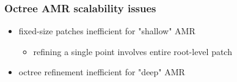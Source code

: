\begin{frame}[fragile] 
\frametitle{Octree AMR scalability issues}
\begin{itemize}
\item fixed-size patches inefficient for "shallow" AMR
\begin{itemize}
\item  refining a single point involves entire root-level patch
\end{itemize}
\item octree refinement inefficient for "deep" AMR
\end{itemize}
\end{frame}

